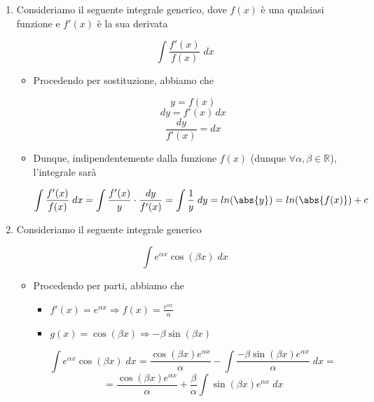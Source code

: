 \documentclass[a4paper, 12pt]{report}
\begin{document}
\begin{enumerate}
\begin{itemize}
        \end{itemize}
        
        \newpage
        
        \item Consideriamo il seguente integrale generico, dove $f(x)$ è una qualsiasi funzione e $f'(x)$ è la sua derivata
        
        \[ \int \frac{f'(x)}{f(x)} \; dx\]
        
        \begin{itemize}
            \item Procedendo per sostituzione, abbiamo che
            
            \[ y = f(x)\]
            \[ dy = f'(x) \, dx \]
            \[ \frac{dy}{f'(x)} = dx \]
            
            \item Dunque, indipendentemente dalla funzione $f(x)$ (dunque $\forall \alpha, \beta \in \mathbb{R}$), l'integrale sarà
            
            \[ \int \frac{f'(x)}{f(x)} \; dx = \int \frac{f'(x)}{y} \cdot \frac{dy}{f'(x)} = \int \frac{1}{y} \; dy = ln(\abs{y}) = ln(\abs{f(x)})+c\]
            
        \end{itemize}
        
        \quad
        
        \quad
        
        \item Consideriamo il seguente integrale generico 
        
        \[ \int e^{\alpha x} \cos(\beta x) \; dx\]
        
        \begin{itemize}
            \item Procedendo per parti, abbiamo che
            
            \begin{itemize}
                \item $f'(x) = e^{\alpha x} \Longrightarrow f(x) = \frac{e^{\alpha x}}{\alpha}$
                \item $g(x) = \cos(\beta x) \Longrightarrow -\beta \sin(\beta x)$
            \end{itemize}
            
            \[ \int e^{\alpha x} \cos(\beta x) \; dx = \frac{\cos(\beta x)e^{\alpha x}}{\alpha} - \int \frac{-\beta \sin(\beta x)e^{\alpha x}}{\alpha} \; dx = \]
            \[ = \frac{\cos(\beta x)e^{\alpha x}}{\alpha} + \frac{\beta}{\alpha} \int \sin(\beta x)e^{\alpha x} \; dx\]
            

\end{itemize}
\end{enumerate}
\end{document}
